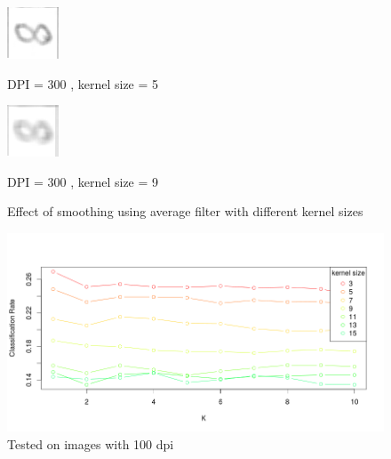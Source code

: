 \begin{figure}[H]
\vspace*{0.5cm} %
	\begin{minipage}[t]{0.45\textwidth}
		\centering
			\includegraphics[width=0.4\linewidth]{figure/mikael_8_2_dpi300_k5.png}
			\caption{DPI = 300 , kernel size = 5}
			\label{fig:dpi_300_5}
	\end{minipage}
\hspace{\fill}
	\begin{minipage}[t]{0.45\textwidth}
		\centering
			\includegraphics[width=0.4\linewidth]{figure/mikael_8_2_dpi300_k9.png}
			\caption{DPI = 300 , kernel size = 9}
			\label{fig:dpi_300_9}
	\end{minipage}
\caption{Effect of smoothing using average filter with different kernel sizes}
\end{figure}

\begin{figure}[H]
\centering
\includegraphics[width = \textwidth]{figure/data_100_15_10.png}
\caption{Tested on images with 100 dpi}
\label{fig:data_100}
\end{figure}

